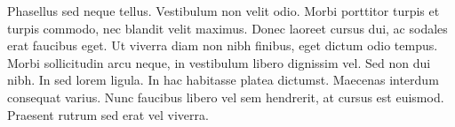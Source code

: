 \documentclass{article}
\begin{document}
Phasellus sed neque tellus. Vestibulum non velit odio. Morbi porttitor turpis et turpis commodo, nec blandit velit maximus. Donec laoreet cursus dui, ac sodales erat faucibus eget. Ut viverra diam non nibh finibus, eget dictum odio tempus. Morbi sollicitudin arcu neque, in vestibulum libero dignissim vel. Sed non dui nibh. In sed lorem ligula. In hac habitasse platea dictumst. Maecenas interdum consequat varius. Nunc faucibus libero vel sem hendrerit, at cursus est euismod. Praesent rutrum sed erat vel viverra. 
\end{document}

